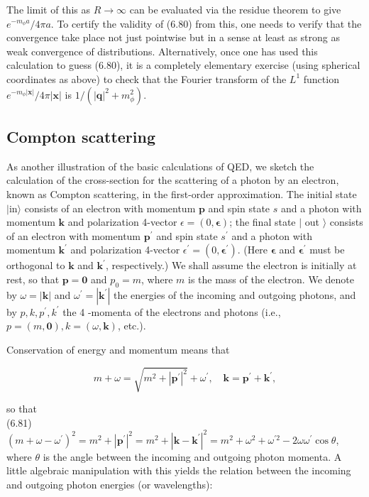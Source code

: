 \documentclass[10pt, letterpaper]{article}
\begin{document}
The limit of this as $R \rightarrow \infty$ can be evaluated via the residue theorem to give $e^{-m_{\phi} a} / 4 \pi a$. To certify the validity of (6.80) from this, one needs to verify that the convergence take place not just pointwise but in a sense at least as strong as weak convergence of distributions. Alternatively, once one has used this calculation to guess (6.80), it is a completely elementary exercise (using spherical coordinates as above) to check that the Fourier transform of the $L^{1}$ function $e^{-m_{\phi}|\mathbf{x}|} / 4 \pi|\mathbf{x}|$ is $1 /\left(|\mathbf{q}|^{2}+m_{\phi}^{2}\right)$.

\subsection*{Compton scattering}
As another illustration of the basic calculations of QED, we sketch the calculation of the cross-section for the scattering of a photon by an electron, known as Compton scattering, in the first-order approximation. The initial state $|\mathrm{in}\rangle$ consists of an electron with momentum $\mathbf{p}$ and spin state $s$ and a photon with momentum $\mathbf{k}$ and polarization 4-vector $\epsilon=(0, \boldsymbol{\epsilon})$; the final state $\mid$ out $\rangle$ consists of an electron with momentum $\mathbf{p}^{\prime}$ and spin state $s^{\prime}$ and a photon with momentum $\mathbf{k}^{\prime}$ and polarization 4-vector $\epsilon^{\prime}=\left(0, \boldsymbol{\epsilon}^{\prime}\right)$. (Here $\boldsymbol{\epsilon}$ and $\boldsymbol{\epsilon}^{\prime}$ must be orthogonal to $\mathbf{k}$ and $\mathbf{k}^{\prime}$, respectively.) We shall assume the electron is initially at rest, so that $\mathbf{p}=\mathbf{0}$ and $p_{0}=m$, where $m$ is the mass of the electron. We denote by $\omega=|\mathbf{k}|$ and $\omega^{\prime}=\left|\mathbf{k}^{\prime}\right|$ the energies of the incoming and outgoing photons, and by $p, k, p^{\prime}, k^{\prime}$ the 4 -momenta of the electrons and photons (i.e., $p=(m, \mathbf{0}), k=(\omega, \mathbf{k})$, etc.).

Conservation of energy and momentum means that

$$
m+\omega=\sqrt{m^{2}+\left|\mathbf{p}^{\prime}\right|^{2}}+\omega^{\prime}, \quad \mathbf{k}=\mathbf{p}^{\prime}+\mathbf{k}^{\prime},
$$

so that\\
(6.81) $\left(m+\omega-\omega^{\prime}\right)^{2}=m^{2}+\left|\mathbf{p}^{\prime}\right|^{2}=m^{2}+\left|\mathbf{k}-\mathbf{k}^{\prime}\right|^{2}=m^{2}+\omega^{2}+\omega^{\prime 2}-2 \omega \omega^{\prime} \cos \theta$,\\
where $\theta$ is the angle between the incoming and outgoing photon momenta. A little algebraic manipulation with this yields the relation between the incoming and outgoing photon energies (or wavelengths):
\end{document}
